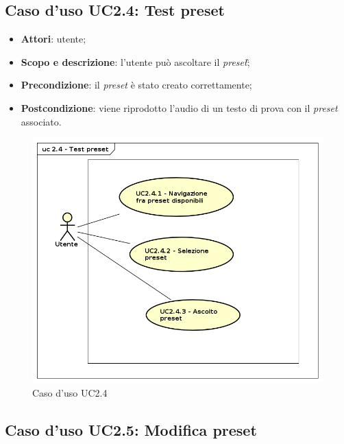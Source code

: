 \subsection{Caso d'uso UC2.4: Test preset}
\label{sec:UC2.4}

\begin{itemize}
\item \textbf{Attori}: utente;
\item \textbf{Scopo e descrizione}: l'utente può ascoltare il \textit{preset}\G;
\item \textbf{Precondizione}: il \textit{preset} è stato creato correttamente;
\item \textbf{Postcondizione}: viene riprodotto l'audio di un testo di prova con il \textit{preset} associato.
\end{itemize}
\begin{figure}[htbp]
\centering
\includegraphics[scale=0.5]{immagini/uc2_4_test_preset.png}
\captionsetup{labelfont=bf}
\caption{Caso d'uso UC2.4}
\end{figure}
\newpage

\subsection{Caso d'uso UC2.5: Modifica preset}
\label{sec:UC2.5}

